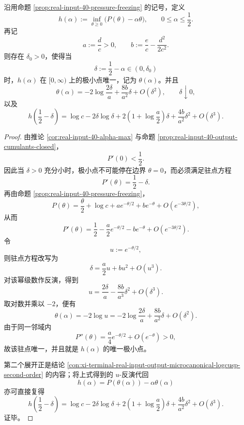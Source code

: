 \begin{theorem}[零温端点微正则包络的极小点与显式尖点闭式]\label{thm:xi-output-microcanonical-logcusp-legendre-closed}
沿用命题 \ref{prop:real-input-40-pressure-freezing} 的记号，定义
\[
h(\alpha):=\inf_{\theta\ge 0}\bigl(P(\theta)-\alpha\theta\bigr),
\qquad
0\le \alpha\le \frac12.
\]
再记
\[
a:=\frac{d}{c}>0,
\qquad
b:=\frac{e}{c}-\frac{d^2}{2c^2}.
\]
则存在 \(\delta_0>0\)，使得当
\[
\delta:=\frac12-\alpha\in(0,\delta_0)
\]
时，\(h(\alpha)\) 在 \([0,\infty)\) 上的极小点唯一，记为 \(\theta(\alpha)\)。并且
\[
\boxed{\;
\theta(\alpha)
=
-2\log\frac{2\delta}{a}
+\frac{8b}{a^2}\delta
+O(\delta^2),
\qquad
\delta\downarrow 0,
\;}
\]
以及
\[
\boxed{\;
h\!\left(\frac12-\delta\right)
=
\log c
-2\delta\log\delta
+2\left(1+\log\frac{a}{2}\right)\delta
+\frac{4b}{a^2}\delta^2
+O(\delta^3).
\;}
\]
\end{theorem}
\begin{proof}
由推论 \ref{cor:real-input-40-alpha-max} 与命题 \ref{prop:real-input-40-output-cumulants-closed}，
\[
P'(0)<\frac12.
\]
因此当 \(\delta>0\) 充分小时，极小点不可能停在边界 \(\theta=0\)，而必须满足驻点方程
\[
P'(\theta)=\frac12-\delta.
\]
再由命题 \ref{prop:real-input-40-pressure-freezing}，
\[
P(\theta)
=
\frac{\theta}{2}+\log c+a e^{-\theta/2}+b e^{-\theta}+O(e^{-3\theta/2}),
\]
从而
\[
P'(\theta)
=
\frac12-\frac{a}{2}e^{-\theta/2}-b e^{-\theta}+O(e^{-3\theta/2}).
\]
令
\[
u:=e^{-\theta/2},
\]
则驻点方程改写为
\[
\delta=\frac{a}{2}u+b u^2+O(u^3).
\]
对该幂级数作反演，得到
\[
u=\frac{2\delta}{a}-\frac{8b}{a^3}\delta^2+O(\delta^3).
\]
取对数并乘以 \(-2\)，便有
\[
\theta(\alpha)
=
-2\log u
=
-2\log\frac{2\delta}{a}
+\frac{8b}{a^2}\delta
+O(\delta^2).
\]
由于同一邻域内
\[
P''(\theta)=\frac{a}{4}e^{-\theta/2}+O(e^{-\theta})>0,
\]
故该驻点唯一，并且就是 \(h(\alpha)\) 的唯一极小点。

第二个展开正是结论 \ref{con:xi-terminal-real-input-output-microcanonical-logcusp-second-order} 的内容；将上式得到的 \(u\)-反演代回
\[
h(\alpha)=P(\theta(\alpha))-\alpha\theta(\alpha)
\]
亦可直接复得
\[
h\!\left(\frac12-\delta\right)
=
\log c
-2\delta\log\delta
+2\left(1+\log\frac{a}{2}\right)\delta
+\frac{4b}{a^2}\delta^2
+O(\delta^3).
\]
证毕。
\end{proof}

